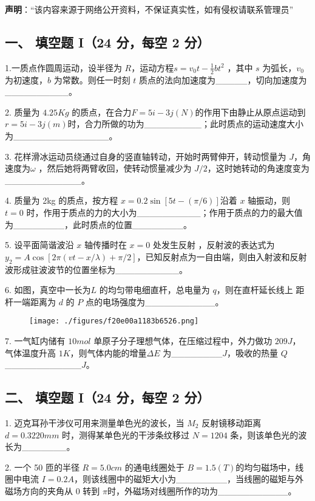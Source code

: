 
\textbf{声明}：“该内容来源于网络公开资料，不保证真实性，如有侵权请联系管理员”

\subsection{一、 填空题 I（24 分，每空 2 分）}
1.一质点作圆周运动，设半径为 $R$，运动方程$s=v_0t-\frac{1}{2}bt^2$ ，其中 $s$ 为弧长，$v_0$为初速度，$b$ 为常数。则任一时刻 $t$ 质点的法向加速度为_____，切向加速度为__________。

2. 质量为 $4.25Kg$ 的质点，在合力$F=5i-3j(N)$的作用下由静止从原点运动到$r=5i-3j(m)$时，合力所做的功为_________；此时质点的运动速度大小为_______________。

3. 花样滑冰运动员绕通过自身的竖直轴转动，开始时两臂伸开，转动惯量为 $J$，角速度为$\omega$ ，然后她将两臂收回，使转动惯量减少为 $J/2$，这时她转动的角速度变为____________。

4. 质量为 2kg 的质点，按方程 $x=0.2\sin[5t-(\pi/6)]$沿着 $x$ 轴振动，则 $t=0$ 时，作用于质点的力的大小为__________；作用于质点的力的最大值为________，此时质点的位置________。

5. 设平面简谐波沿 $x$ 轴传播时在 $x=0$ 处发生反射 ，反射波的表达式为$y_2=A\cos [2\pi(vt-x/\lambda)+\pi/2]$，已知反射点为一自由端，则由入射波和反射波形成驻波波节的位置坐标为__________。

6. 如图，真空中一长为$L$ 的均匀带电细直杆，总电量为 $q$，则在直杆延长线上
距杆一端距离为 $d$ 的 $P$ 点的电场强度为___________。
\begin{figure}[ht]
\centering
\texttt{[image: ./figures/f20e00a1183b6526.png]}
\caption{} \label{fig_NJUD4_1}
\end{figure}
7. 一气缸内储有 $10mol$ 单原子分子理想气体，在压缩过程中，外力做功 $209J$，
气体温度升高 $1K$，则气体内能的增量$\Delta E$ 为________$J$，吸收的热量 $Q $____________$J$。
\subsection{二、 填空题 I（24 分，每空 2 分）}
1. 迈克耳孙干涉仪可用来测量单色光的波长，当 $M_2$ 反射镜移动距离$d=0.3220mm$ 时，测得某单色光的干涉条纹移过 $N=1204$ 条，则该单色光的波长为_______。

2. 一个 50 匝的半径 $R=5.0cm$ 的通电线圈处于 $B=1.5(T)$的均匀磁场中，线圈中电流 $I=0.2A$，则该线圈中的磁矩大小为________，当线圈的磁矩与外磁场方向的夹角从 0 转到 $\pi$时，外磁场对线圈所作的功为___________。

